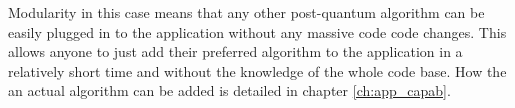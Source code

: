 Modularity in this case means that any other post-quantum algorithm can be easily plugged in to the application without any massive code code changes. This allows anyone to just add their preferred algorithm to the application in a relatively short time and without the knowledge of the whole code base. How the an actual algorithm can be added is detailed in chapter \ref{ch:app_capab}.